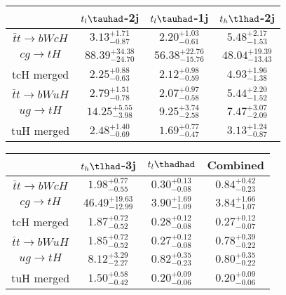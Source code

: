 \centering
\begin{tabular}{|c|c|c|c|} \hline
 & $t_l\tauhad$-2j & $t_l\tauhad$-1j & $t_h\tlhad$-2j\\\hline
$\bar{t}t\to bWcH$ & $3.13^{+1.71}_{-0.87}$ & $2.20^{+1.03}_{-0.61}$ & $5.48^{+2.17}_{-1.53}$\\\hline
$cg\to tH$ & $88.39^{+34.38}_{-24.70}$ & $56.38^{+22.76}_{-15.76}$ & $48.04^{+19.39}_{-13.43}$\\\hline
tcH merged & $2.25^{+0.88}_{-0.63}$ & $2.12^{+0.98}_{-0.59}$ & $4.93^{+1.96}_{-1.38}$\\\hline
$\bar{t}t\to bWuH$ & $2.79^{+1.51}_{-0.78}$ & $2.07^{+0.97}_{-0.58}$ & $5.44^{+2.20}_{-1.52}$\\\hline
$ug\to tH$ & $14.25^{+5.55}_{-3.98}$ & $9.25^{+3.74}_{-2.58}$ & $7.47^{+3.07}_{-2.09}$\\\hline
tuH merged & $2.48^{+1.40}_{-0.69}$ & $1.69^{+0.77}_{-0.47}$ & $3.13^{+1.24}_{-0.87}$\\\hline
\end{tabular}
\begin{tabular}{|c|c|c|c|} \hline
 & $t_h\tlhad$-3j & $t_l\thadhad$ & Combined\\\hline
$\bar{t}t\to bWcH$ & $1.98^{+0.77}_{-0.55}$ & $0.30^{+0.13}_{-0.08}$ & $0.84^{+0.42}_{-0.23}$\\\hline
$cg\to tH$ & $46.49^{+19.63}_{-12.99}$ & $3.90^{+1.69}_{-1.09}$ & $3.84^{+1.66}_{-1.07}$\\\hline
tcH merged & $1.87^{+0.72}_{-0.52}$ & $0.28^{+0.12}_{-0.08}$ & $0.27^{+0.12}_{-0.07}$\\\hline
$\bar{t}t\to bWuH$ & $1.85^{+0.72}_{-0.52}$ & $0.27^{+0.12}_{-0.08}$ & $0.78^{+0.39}_{-0.22}$\\\hline
$ug\to tH$ & $8.12^{+3.29}_{-2.27}$ & $0.82^{+0.35}_{-0.23}$ & $0.80^{+0.35}_{-0.22}$\\\hline
tuH merged & $1.50^{+0.58}_{-0.42}$ & $0.20^{+0.09}_{-0.06}$ & $0.20^{+0.09}_{-0.06}$\\\hline
\end{tabular}
